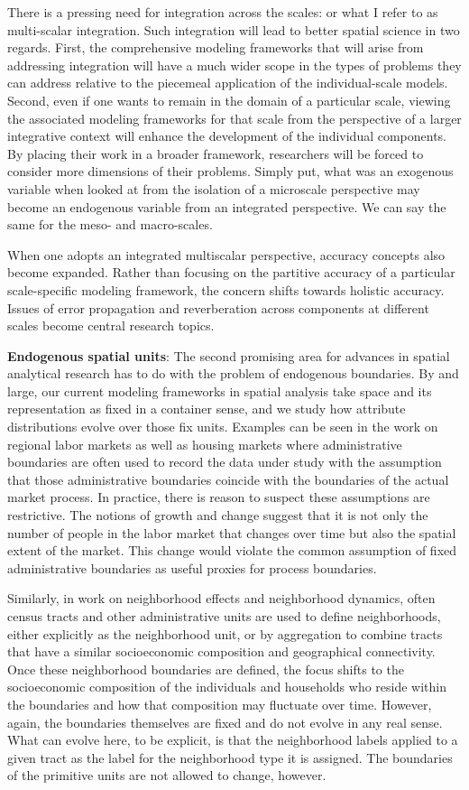 \documentclass[11pt]{article}
\begin{document}
There is a pressing need for integration across the scales: or what I refer to
as multi-scalar integration. Such integration will lead to better spatial
science in two regards. First, the comprehensive modeling frameworks that will
arise from addressing integration will have a much wider scope in the types of
problems they can address relative to the piecemeal application of the
individual-scale models. Second, even if one wants to remain in the domain of a
particular scale, viewing the associated modeling frameworks for that scale
from the perspective of a larger integrative context will enhance the development
of the individual components. By placing their work in a broader framework,
researchers will be forced to consider more dimensions of their problems.
Simply put, what was an exogenous variable when looked at from the isolation of
a microscale perspective may become an endogenous variable from an integrated
perspective. We can say the same for the meso- and macro-scales.

When one adopts an integrated multiscalar perspective, accuracy concepts also
become expanded. Rather than focusing on the partitive accuracy of a particular
scale-specific modeling framework, the concern shifts towards holistic accuracy.
Issues of error propagation and reverberation across components at different
scales become central research topics.


\textbf{Endogenous spatial units}: The second promising area for advances in spatial
analytical research has to do with the problem of endogenous boundaries. By and
large, our current modeling frameworks in spatial analysis take space and its
representation as fixed in a container sense, and we study how attribute
distributions evolve over those fix units. Examples can be seen in the work on
regional labor markets as well as housing markets where administrative
boundaries are often used to record the data under study with the assumption
that those administrative boundaries coincide with the boundaries of the actual
market process. In practice, there is reason to suspect these assumptions are
restrictive. The notions of growth and change suggest that it is not only the
number of people in the labor market that changes over time but also the spatial
extent of the market. This change would violate the common assumption of fixed
administrative boundaries as useful proxies for process boundaries.

Similarly, in work on neighborhood effects and neighborhood dynamics, often
census tracts and other administrative units are used to define neighborhoods,
either explicitly as the neighborhood unit, or by aggregation to combine tracts
that have a similar socioeconomic composition and geographical connectivity.
Once these neighborhood boundaries are defined, the focus shifts to the
socioeconomic composition of the individuals and households who reside within
the boundaries and how that composition may fluctuate over time. However, again, the
boundaries themselves are fixed and do not evolve in any real sense. What can
evolve here, to be explicit, is that the neighborhood labels applied to a
given tract as the label for the neighborhood type it is assigned. The
boundaries of the primitive units are not allowed to change, however.
\end{document}

